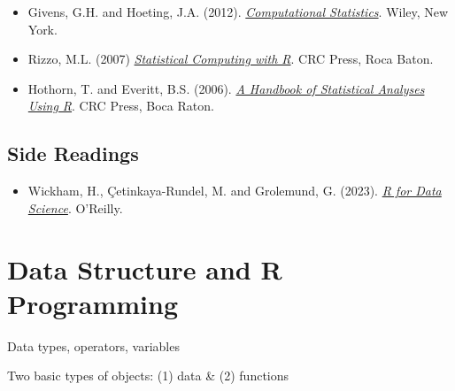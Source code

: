 \documentclass[
  letterpaper,
  DIV=11,
  numbers=noendperiod]{scrreprt}
\providecommand{\tightlist}{%
  \setlength{\itemsep}{0pt}\setlength{\parskip}{0pt}}
\begin{document}

\begin{itemize}
\item
  Givens, G.H. and Hoeting, J.A. (2012).
  \href{https://www.stat.colostate.edu/computationalstatistics/}{\emph{Computational
  Statistics}}. Wiley, New York.
\item
  Rizzo, M.L. (2007)
  \href{https://a-roshani.ir/files/SC/\%5B4\%5D\%20\%5BMaria\%20L.\%20Rizzo\%5D\%5B2019\%5D\%20Statistical\%20Computing\%20\%20with\%20R,\%20Second\%20Edition.pdf}{\emph{Statistical
  Computing with R}}. CRC Press, Roca Baton.
\item
  Hothorn, T. and Everitt, B.S. (2006).
  \href{https://digitallibrary.tsu.ge/book/2019/september/books/A-Handbook-of-Statistical-Analyses.pdf}{\emph{A
  Handbook of Statistical Analyses Using R}}. CRC Press, Boca Raton.
\end{itemize}

\section*{Side Readings}\label{side-readings}


\begin{itemize}
\tightlist
\item
  Wickham, H., Çetinkaya-Rundel, M. and Grolemund, G. (2023).
  \href{https://r4ds.hadley.nz/}{\emph{R for Data Science}}. O'Reilly.
\end{itemize}


\chapter{Data Structure and R
Programming}\label{data-structure-and-r-programming}

\newcommand{\E}{\mathbb{E}}
\newcommand{\R}{\mathbb{R}}
\newcommand{\var}{\mathbb{V}ar}
\newcommand{\cov}{\mathbb{C}ov}
\newcommand{\corr}{\mathbb{C}orr}
\newcommand{\unif}{\operatorname{Unif}}
\newcommand{\geom}{\operatorname{Geom}}
\newcommand{\bet}{\operatorname{Beta}}
\newcommand{\bern}{\operatorname{Bern}}
\newcommand{\iid}{\overset{iid}{\sim}}
\newcommand{\ef}{\operatorname{Eff}}
\newcommand{\htt}{\hat{\theta}}

Data types, operators, variables

Two basic types of objects: (1) data \& (2) functions
\end{document}
